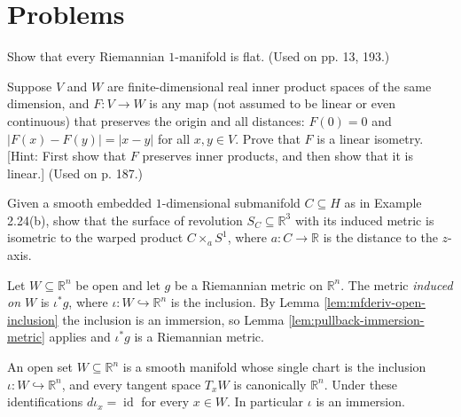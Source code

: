 \section{Problems}

\begin{exercise}\label{prob:riemannian-1-manifold-flat}
Show that every Riemannian $1$-manifold is flat. (Used on pp. 13, 193.)
\end{exercise}

\begin{exercise}\label{prob:distance-preserving-map-linear-isometry}
Suppose $V$ and $W$ are finite-dimensional real inner product spaces of the same dimension, and $F: V \to W$ is any map (not assumed to be linear or even continuous) that preserves the origin and all distances: $F(0) = 0$ and $|F(x) - F(y)| = |x - y|$ for all $x, y \in V$. Prove that $F$ is a linear isometry. [Hint: First show that $F$ preserves inner products, and then show that it is linear.] (Used on p. 187.)
\end{exercise}

\begin{exercise}\label{prob:surface-of-revolution-warped-product}
Given a smooth embedded $1$-dimensional submanifold $C \subseteq H$ as in Example 2.24(b), show that the surface of revolution $S_C \subseteq \mathbb{R}^3$ with its induced metric is isometric to the warped product $C \times_a S^1$, where $a: C \to \mathbb{R}$ is the distance to the $z$-axis.
\end{exercise}

\begin{definition}
\label{def:open-submanifold-metric}
\leanok
{}
Let $W \subseteq \mathbb{R}^n$ be open and let $g$ be a Riemannian metric on $\mathbb{R}^n$. The metric \emph{induced on $W$} is $\iota^* g$, where $\iota : W \hookrightarrow \mathbb{R}^n$ is the inclusion. By Lemma \ref{lem:mfderiv-open-inclusion} the inclusion is an immersion, so Lemma \ref{lem:pullback-immersion-metric} applies and $\iota^* g$ is a Riemannian metric.
\end{definition}

\begin{lemma}
\label{lem:mfderiv-open-inclusion}
\leanok
An open set $W \subseteq \mathbb{R}^n$ is a smooth manifold whose single chart is the inclusion $\iota : W \hookrightarrow \mathbb{R}^n$, and every tangent space $T_x W$ is canonically $\mathbb{R}^n$. Under these identifications $d\iota_x = \operatorname{id}$ for every $x \in W$. In particular $\iota$ is an immersion.
\end{lemma}

